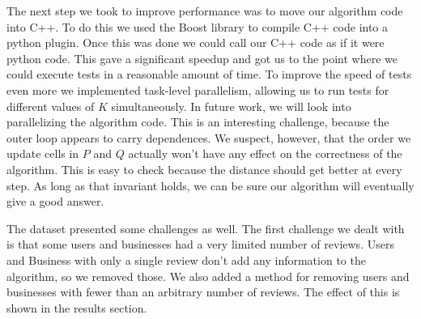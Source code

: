 The next step we took to improve performance was to move our algorithm code into
C++. To do this we used the Boost library to compile C++ code into a python
plugin. Once this was done we could call our C++ code as if it were python code.
This gave a significant speedup and got us to the point where we could execute
tests in a reasonable amount of time. To improve the speed of tests even more we
implemented task-level parallelism, allowing us to run tests for different
values of $K$ simultaneously. In future work, we will look into parallelizing
the algorithm code. This is an interesting challenge, because the outer loop
appears to carry dependences. We suspect, however, that the order we update
cells in $P$ and $Q$ actually won't have any effect on the correctness of the
algorithm. This is easy to check because the distance should get better at every
step. As long as that invariant holds, we can be sure our algorithm will
eventually give a good answer.

The dataset presented some challenges as well. The first challenge we dealt with
is that some users and businesses had a very limited number of reviews. Users
and Business with only a single review don't add any information to the
algorithm, so we removed those. We also added a method for removing users and
businesses with fewer than an arbitrary number of reviews. The effect of this is
shown in the results section.
